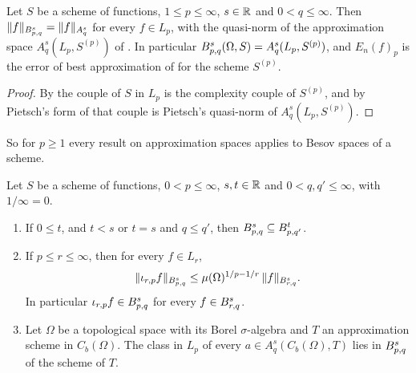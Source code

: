 \begin{lemma}
\label{lem:besov-bridge}
\leanok
{}
Let $S$ be a scheme of functions, $1 \leq p \leq \infty$, $s \in \mathbb{R}$ and $0 < q \leq \infty$.
Then $\|f\|_{B^{s}_{p,q}} = \|f\|_{A^s_q}$ for every $f \in L_p$, with the quasi-norm of the
approximation space $A^s_q(L_p, S^{(p)})$ of . In particular
$B^{s}_{p,q}(\Omega, S) = A^s_q(L_p, S^{(p)})$, and $E_n(f)_p$ is the error of best
approximation of  for the scheme $S^{(p)}$.
\end{lemma}

\begin{proof}
\leanok
{}
By  the couple of $S$ in $L_p$ is the complexity couple of
$S^{(p)}$, and by  Pietsch's form of that couple is
Pietsch's quasi-norm of $A^s_q(L_p, S^{(p)})$.
\end{proof}

So for $p \geq 1$ every result on approximation spaces applies to Besov spaces of a scheme.

\begin{proposition}
\label{prop:besov-elementary}
\leanok
{}
Let $S$ be a scheme of functions, $0 < p \leq \infty$, $s, t \in \mathbb{R}$ and
$0 < q, q' \leq \infty$, with $1/\infty = 0$.
\begin{enumerate}
  \item If $0 \leq t$, and $t < s$ or $t = s$ and $q \leq q'$, then
    $B^{s}_{p,q} \subseteq B^{t}_{p,q'}$.
  \item If $p \leq r \leq \infty$, then for every $f \in L_r$,
    \[
      \|\iota_{r,p} f\|_{B^{s}_{p,q}} \leq \mu(\Omega)^{1/p - 1/r} \, \|f\|_{B^{s}_{r,q}} .
    \]
    In particular $\iota_{r,p} f \in B^{s}_{p,q}$ for every $f \in B^{s}_{r,q}$.
  \item Let $\Omega$ be a topological space with its Borel $\sigma$-algebra and $T$ an
    approximation scheme in $C_b(\Omega)$. The class in $L_p$ of every
    $a \in A^s_q(C_b(\Omega), T)$ lies in $B^{s}_{p,q}$ of the scheme of $T$.
\end{enumerate}
\end{proposition}

